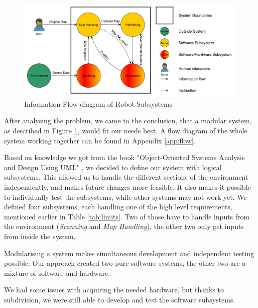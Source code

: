 \begin{figure}[!ht]
	\centering
	\includegraphics[width=\textwidth]{figures/intro/systemview}
	\caption{Information-Flow diagram of Robot Subsystems}
	\label{fig:system} 
\end{figure}

After analysing the problem,
we came to the conclusion,
that a modular system,
as described in Figure \ref{fig:system},
would fit our needs best.
A flow diagram of the whole system working together can be found in Appendix \ref{app:flow}.

Based on knowledge we got from the book
"Object-Oriented Systems Analysis and Design  Using UML" \cite{Benett2010},
we decided to define our system with logical subsystems.
This allowed us to handle the different sections of the environment independently,
and makes future changes more feasible.
It also makes it possible to individually test the subsystems,
while other systems may not work yet.
We defined four subsystems, each handling one of the high level requirements,
mentioned earlier in Table \ref{tab:limits}.
Two of those have to handle inputs from the environment (\emph{Scanning} and \emph{Map Handling}),
the other two only get inputs from inside the system.

Modularising a system makes simultaneous development
and independent testing possible.
Our approach created two pure software systems,
the other two are a mixture of software and hardware.

We had some issues with acquiring the needed hardware,
but thanks to subdivision,
we were still able to develop and test the software subsystems.

